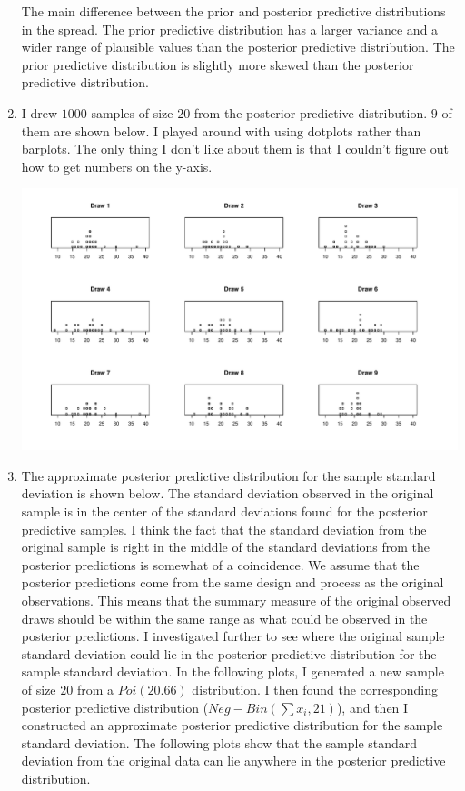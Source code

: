 \documentclass[12pt]{article}\usepackage[]{graphicx}\usepackage[]{color}
\newenvironment{knitrout}{}{} %
\begin{document}
\begin{doublespacing}
\begin{enumerate}
The main difference between the prior and posterior predictive distributions in the spread. The prior predictive distribution has a larger variance and a wider range of plausible values than the posterior predictive distribution. The prior predictive distribution is slightly more skewed than the posterior predictive distribution.

\item I drew $1000$ samples of size $20$ from the posterior predictive distribution. $9$ of them are shown below. I played around with using dotplots rather than barplots. The only thing I don't like about them is that I couldn't figure out how to get numbers on the y-axis.

\begin{knitrout}\footnotesize
{}\color{fgcolor}
\includegraphics[width=\linewidth]{figure/drawmatrix-1} 

\end{knitrout}

\item The approximate posterior predictive distribution for the sample standard deviation is shown below. The standard deviation observed in the original sample is in the center of the standard deviations found for the posterior predictive samples. I think the fact that the standard deviation from the original sample is right in the middle of the standard deviations from the posterior predictions is somewhat of a coincidence. We assume that the posterior predictions come from the same design and process as the original observations. This means that the summary measure of the original observed draws should be within the same range as what could be observed in the posterior predictions. I investigated further to see where the original sample standard deviation could lie in the posterior predictive distribution for the sample standard deviation. In the following plots, I generated a new sample of size $20$ from a $Poi(20.66)$ distribution. I then found the corresponding posterior predictive distribution ($Neg-Bin(\sum x_i, 21)$), and then I constructed an approximate posterior predictive distribution for the sample standard deviation. The following plots show that the sample standard deviation from the original data can lie anywhere in the posterior predictive distribution.


\end{enumerate}
\end{doublespacing}
\end{document}
